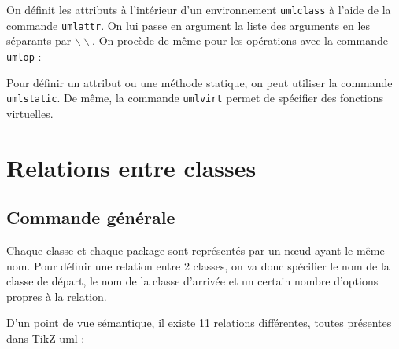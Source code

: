 \documentclass[a4paper,11pt]{report}
\newcommand{\inputTikZ}[1]{%
  }%
\newcommand{\inputTikZ}[1]{%
    \texttt{[image: fig/\#1.pdf]}%
  }%
\newcommand{\tuml}{{\sc TikZ-uml}}
\begin{document}
On définit les attributs à l'intérieur d'un environnement {\tt umlclass} à l'aide de la commande {\tt umlattr}. On lui passe en argument la liste des arguments en les séparants par $\backslash\backslash$. On procède de même pour les opérations avec la commande {\tt umlop} :

\medskip

\begin{minipage}{0.5\textwidth}

\end{minipage}
\begin{minipage}{0.4\textwidth}
\begin{center}
\inputTikZ{figure7}
\end{center}
\end{minipage}

\medskip

Pour définir un attribut ou une méthode statique, on peut utiliser la commande {\tt umlstatic}. De même, la commande {\tt umlvirt} permet de spécifier des fonctions virtuelles.

\section{Relations entre classes}

\subsection{Commande générale}

Chaque classe et chaque package sont représentés par un n\oe{}ud ayant le même nom. Pour définir une relation entre 2 classes, on va donc spécifier le nom de la classe de départ, le nom de la classe d'arrivée et un certain nombre d'options propres à la relation.

\medskip

\begin{minipage}{0.5\textwidth}

\end{minipage}
\begin{minipage}{0.4\textwidth}
\begin{center}
\inputTikZ{figure8}
\end{center}
\end{minipage}

D'un point de vue sémantique, il existe 11 relations différentes, toutes présentes dans \tuml{} :
\end{document}
